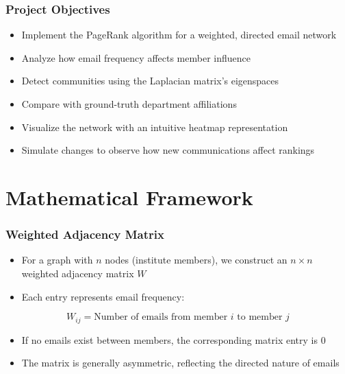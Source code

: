 \documentclass{beamer}
\begin{document}
\begin{frame}
    \frametitle{Project Objectives}
    \begin{itemize}
        \item Implement the PageRank algorithm for a weighted, directed email network
        \item Analyze how email frequency affects member influence
        \item Detect communities using the Laplacian matrix's eigenspaces
        \item Compare with ground-truth department affiliations
        \item Visualize the network with an intuitive heatmap representation
        \item Simulate changes to observe how new communications affect rankings
    \end{itemize}
\end{frame}

\section{Mathematical Framework}

\begin{frame}
    \frametitle{Weighted Adjacency Matrix}
    \begin{itemize}
        \item For a graph with $n$ nodes (institute members), we construct an $n \times n$ weighted adjacency matrix $W$
        \item Each entry represents email frequency:
    \end{itemize}
    \begin{equation}
        W_{ij} = \text{Number of emails from member $i$ to member $j$}
    \end{equation}
    \begin{itemize}
        \item If no emails exist between members, the corresponding matrix entry is 0
        \item The matrix is generally asymmetric, reflecting the directed nature of emails
    \end{itemize}
\end{frame}
\end{document}
